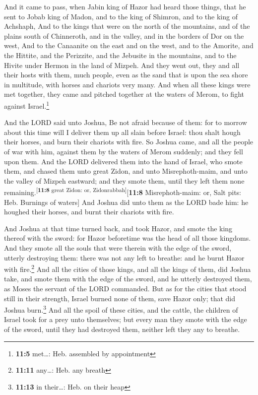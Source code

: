  And it came to pass, when Jabin king of Hazor had heard
those things, that he sent to Jobab king of Madon, and to the king of
Shimron, and to the king of Achshaph,  And to the kings
that were on the north of the mountains, and of the plains south of
Chinneroth, and in the valley, and in the borders of Dor on the west,
 And to the Canaanite on the east and on the west, and to
the Amorite, and the Hittite, and the Perizzite, and the Jebusite in the
mountains, and to the Hivite under Hermon in the land of Mizpeh.
 And they went out, they and all their hosts with them,
much people, even as the sand that is upon the sea shore in multitude,
with horses and chariots very many.  And when all these
kings were met together, they came and pitched together at the waters of
Merom, to fight against Israel.\footnote{\textbf{11:5} met\ldots: Heb.
  assembled by appointment}

 And the LORD said unto Joshua, Be not afraid because of
them: for to morrow about this time will I deliver them up all slain
before Israel: thou shalt hough their horses, and burn their chariots
with fire.  So Joshua came, and all the people of war with
him, against them by the waters of Merom suddenly; and they fell upon
them.  And the LORD delivered them into the hand of
Israel, who smote them, and chased them unto great Zidon, and unto
Misrephoth-maim, and unto the valley of Mizpeh eastward; and they smote
them, until they left them none
remaining.\textsuperscript{{[}\textbf{11:8} great Zidon: or,
Zidonrabbah{]}}{[}\textbf{11:8} Misrephoth-maim: or, Salt pits: Heb.
Burnings of waters{]}  And Joshua did unto them as the
LORD bade him: he houghed their horses, and burnt their chariots with
fire.

 And Joshua at that time turned back, and took Hazor, and
smote the king thereof with the sword: for Hazor beforetime was the head
of all those kingdoms.  And they smote all the souls that
were therein with the edge of the sword, utterly destroying them: there
was not any left to breathe: and he burnt Hazor with fire.\footnote{\textbf{11:11}
  any\ldots: Heb. any breath}  And all the cities of
those kings, and all the kings of them, did Joshua take, and smote them
with the edge of the sword, and he utterly destroyed them, as Moses the
servant of the LORD commanded.  But as for the cities
that stood still in their strength, Israel burned none of them, save
Hazor only; that did Joshua burn.\footnote{\textbf{11:13} in
  their\ldots: Heb. on their heap}  And all the spoil of
these cities, and the cattle, the children of Israel took for a prey
unto themselves; but every man they smote with the edge of the sword,
until they had destroyed them, neither left they any to breathe.

